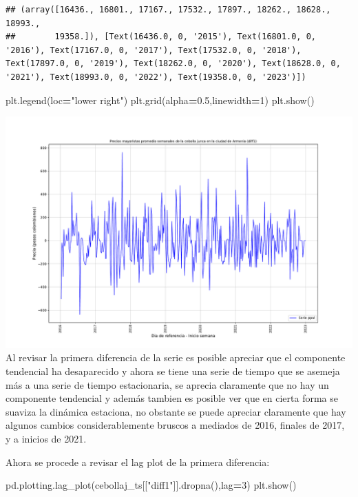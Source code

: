 \documentclass[
]{book}
\newenvironment{Shaded}{\begin{snugshade}}{\end{snugshade}}
\newcommand{\DecValTok}[1]{\textcolor[rgb]{0.00,0.00,0.81}{#1}}
\newcommand{\FloatTok}[1]{\textcolor[rgb]{0.00,0.00,0.81}{#1}}
\newcommand{\NormalTok}[1]{#1}
\newcommand{\OperatorTok}[1]{\textcolor[rgb]{0.81,0.36,0.00}{\textbf{#1}}}
\newcommand{\StringTok}[1]{\textcolor[rgb]{0.31,0.60,0.02}{#1}}
\begin{document}
\begin{verbatim}
## (array([16436., 16801., 17167., 17532., 17897., 18262., 18628., 18993.,
##        19358.]), [Text(16436.0, 0, '2015'), Text(16801.0, 0, '2016'), Text(17167.0, 0, '2017'), Text(17532.0, 0, '2018'), Text(17897.0, 0, '2019'), Text(18262.0, 0, '2020'), Text(18628.0, 0, '2021'), Text(18993.0, 0, '2022'), Text(19358.0, 0, '2023')])
\end{verbatim}

\begin{Shaded}
\begin{Highlighting}[]
\NormalTok{plt.legend(loc}\OperatorTok{=}\StringTok{"lower right"}\NormalTok{)}
\NormalTok{plt.grid(alpha}\OperatorTok{=}\FloatTok{0.5}\NormalTok{,linewidth}\OperatorTok{=}\DecValTok{1}\NormalTok{)}
\NormalTok{plt.show()}
\end{Highlighting}
\end{Shaded}

\includegraphics{bookdown-demo_files/figure-latex/unnamed-chunk-60-23.pdf}
Al revisar la primera diferencia de la serie es posible apreciar que el componente tendencial ha desaparecido y ahora se tiene una serie de tiempo que se asemeja más a una serie de tiempo estacionaria, se aprecia claramente que no hay un componente tendencial y además tambien es posible ver que en cierta forma se suaviza la dinámica estaciona, no obstante se puede apreciar claramente que hay algunos cambios considerablemente bruscos a mediados de 2016, finales de 2017, y a inicios de 2021.

Ahora se procede a revisar el lag plot de la primera diferencia:

\begin{Shaded}
\begin{Highlighting}[]

\NormalTok{pd.plotting.lag\_plot(cebollaj\_ts[[}\StringTok{"diff1"}\NormalTok{]].dropna(),lag}\OperatorTok{=}\DecValTok{3}\NormalTok{)}
\NormalTok{plt.show()}
\end{Highlighting}
\end{Shaded}
\end{document}
